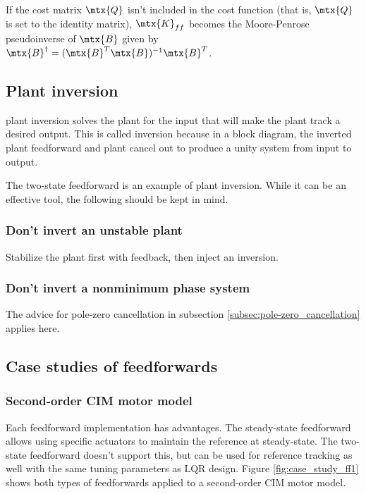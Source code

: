 \begin{remark}
  If the cost matrix $\mtx{Q}$ isn't included in the cost function (that is,
  $\mtx{Q}$ is set to the identity matrix), $\mtx{K}_{ff}$ becomes the
  Moore-Penrose pseudoinverse of $\mtx{B}$ given by
  $\mtx{B}^\dagger = (\mtx{B}^T\mtx{B})^{-1}\mtx{B}^T$.
\end{remark}

\subsection{Plant inversion}

\Gls{plant} inversion solves the \gls{plant} for the input that will make the
\gls{plant} track a desired output. This is called inversion because in a block
diagram, the inverted \gls{plant} feedforward and \gls{plant} cancel out to
produce a unity system from input to output.

The two-state feedforward is an example of \gls{plant} inversion. While it can
be an effective tool, the following should be kept in mind.

\subsubsection{Don't invert an unstable plant}

Stabilize the plant first with feedback, then inject an inversion.

\subsubsection{Don't invert a nonminimum phase system}

The advice for pole-zero cancellation in subsection
\ref{subsec:pole-zero_cancellation} applies here.

\subsection{Case studies of feedforwards}

\subsubsection{Second-order CIM motor model}

Each feedforward implementation has advantages. The steady-state feedforward
allows using specific actuators to maintain the \gls{reference} at steady-state.
The two-state feedforward doesn't support this, but can be used for
\gls{reference} \gls{tracking} as well with the same tuning parameters as LQR
design. Figure \ref{fig:case_study_ff1} shows both types of feedforwards applied
to a second-order CIM motor model.

